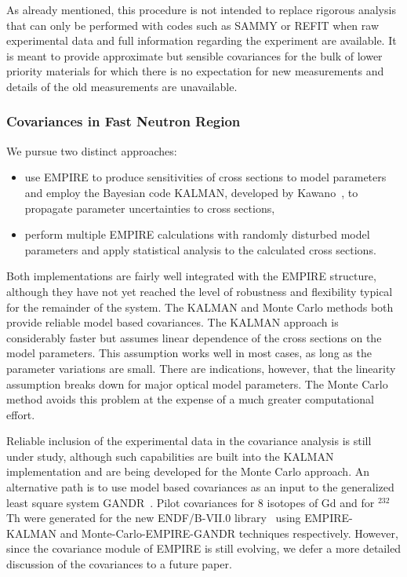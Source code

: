 As already mentioned, this procedure is not intended to replace rigorous
analysis that can only be performed with codes such as SAMMY or REFIT when
raw experimental data and full information regarding the experiment are
available. It is meant to provide approximate but sensible covariances for
the bulk of lower priority materials for which there is no expectation for
new measurements and details of the old measurements are unavailable.

\subsubsection{Covariances in Fast Neutron Region}

We pursue two distinct approaches:

\begin{itemize}
\item use EMPIRE to produce sensitivities of cross sections to model
parameters and employ the Bayesian code KALMAN, developed by Kawano~\cite%
{Kawano:97}, to propagate parameter uncertainties to cross sections,

\item perform multiple EMPIRE calculations with randomly disturbed model
parameters and apply statistical analysis to the calculated cross sections.
\end{itemize}

Both implementations are fairly well integrated with the EMPIRE structure,
although they have not yet reached the level of robustness and flexibility
typical for the remainder of the system. The KALMAN and Monte Carlo
methods both provide reliable model based covariances. The KALMAN approach
is considerably faster but assumes linear dependence of the cross sections on
the model parameters. This assumption works well in most cases, as long as
the parameter variations are small. There are indications, however, that the
linearity assumption breaks down for major optical model parameters. The
Monte Carlo method avoids this problem at the expense of a much greater
computational effort.

Reliable inclusion of the experimental data in the covariance analysis is
still under study, although such capabilities are built into the KALMAN
implementation and are being developed for the Monte Carlo approach. An
alternative path is to use model based covariances as an input to the
generalized least square system GANDR~\cite{GANDR}. Pilot covariances for 8
isotopes of Gd and for $^{232}$Th were generated for the new ENDF/B-VII.0
library~\cite{ENDF-VII} using EMPIRE-KALMAN and Monte-Carlo-EMPIRE-GANDR
techniques respectively. However, since the covariance module of EMPIRE is
still evolving, we defer a more detailed discussion of the covariances to
a future paper.

